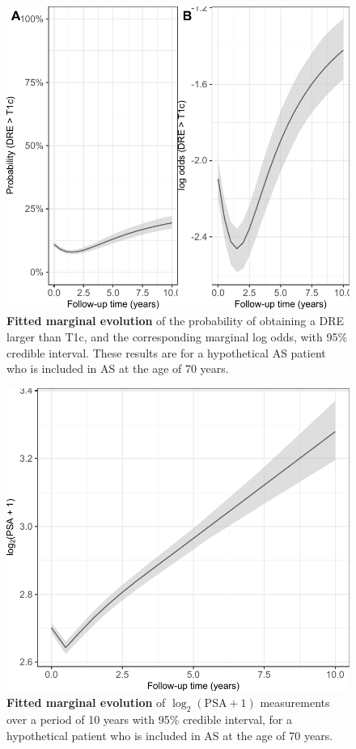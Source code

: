 \begin{subappendices}
\begin{figure}
\includegraphics{contents/c3/images/c3_fig_app1.pdf}
\caption{\textbf{Fitted marginal evolution} of the probability of obtaining a DRE larger than T1c, and the corresponding marginal log odds, with 95\% credible interval. These results are for a hypothetical AS patient who is included in AS at the age of 70 years.}
\label{c3:fig:app1}
\end{figure}

\begin{figure}
\includegraphics{contents/c3/images/c3_fig_app2.pdf}
\caption{\textbf{Fitted marginal evolution} of $\log_2(\mbox{PSA} + 1)$ measurements over a period of 10 years with 95\% credible interval, for a hypothetical patient who is included in AS at the age of 70 years.}
\label{c3:fig:app2}
\end{figure}


\end{subappendices}
